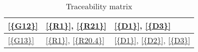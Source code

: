 \begin{table}[H]
\begin{tabular}{|l|p{8cm}|p{5cm}|}
            \ref{{G12}}      & \ref{{R1}}, \ref{{R21}}                                                                                                                                                                                                      & \ref{{D1}}, \ref{{D3}}                                                                         \\\hline
            \ref{{G13}}      & \ref{{R1}}, \ref{{R20.4}}                                                                                                                                                                                                    & \ref{{D1}}, \ref{{D2}}, \ref{{D3}}                                                             \\\hline
      \end{tabular}
      \caption{Traceability matrix}
      \label{table:Traceability matrix}
\end{table}

